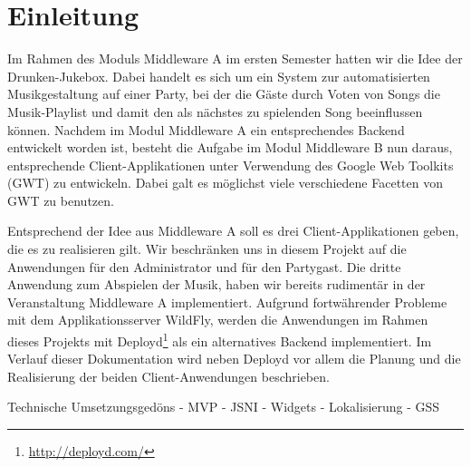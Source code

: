 \section{Einleitung}
Im Rahmen des Moduls Middleware A im ersten Semester hatten wir die Idee der Drunken-Jukebox. Dabei handelt es sich um ein System zur automatisierten Musikgestaltung auf einer Party, bei der die Gäste durch Voten von Songs die Musik-Playlist und damit den als nächstes zu spielenden Song beeinflussen können. Nachdem im Modul Middleware A ein entsprechendes Backend entwickelt worden ist, besteht die Aufgabe im Modul Middleware B nun daraus, entsprechende Client-Applikationen unter Verwendung des Google Web Toolkits (GWT) zu entwickeln. Dabei galt es möglichst viele verschiedene Facetten von GWT zu benutzen.

Entsprechend der Idee aus Middleware A soll es drei Client-Applikationen geben, die es zu realisieren gilt. Wir beschränken uns in diesem Projekt auf die Anwendungen für den Administrator und für den Partygast. Die dritte Anwendung zum Abspielen der Musik, haben wir bereits rudimentär in der Veranstaltung Middleware A implementiert. Aufgrund fortwährender Probleme mit dem Applikationsserver WildFly, werden die Anwendungen im Rahmen dieses Projekts mit Deployd\footnote{\url{http://deployd.com/}} als ein alternatives Backend implementiert. Im Verlauf dieser Dokumentation wird neben Deployd vor allem die Planung und die Realisierung der beiden Client-Anwendungen beschrieben.

Technische Umsetzungsgedöns
- MVP
- JSNI
- Widgets
- Lokalisierung
- GSS